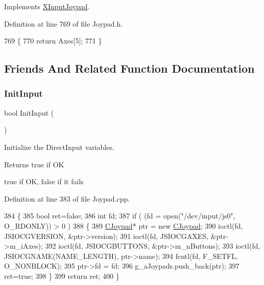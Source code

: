 Implements \hyperlink{struct_x_input_joypad_a4319cae362154a8e069ebe290db8239b}{X\+Input\+Joypad}.



Definition at line 769 of file Joypad.\+h.


\begin{DoxyCode}
769                             \{
770         \textcolor{keywordflow}{return} Axes[5];
771     \}
\end{DoxyCode}


\subsection{Friends And Related Function Documentation}
\mbox{\label{class_c_joypad_ab38988ebf6ab3808447c491d4f5874e0}} 
\subsubsection{\texorpdfstring{Init\+Input}{InitInput}}
{\footnotesize\ttfamily bool Init\+Input (\begin{DoxyParamCaption}{ }\end{DoxyParamCaption})\hspace{0.3cm}{\ttfamily [friend]}}



Initialize the Direct\+Input variables. 

\begin{DoxyReturn}{Returns}
true if OK

true if OK, false if it fails 
\end{DoxyReturn}


Definition at line 383 of file Joypad.\+cpp.


\begin{DoxyCode}
384 \{
385     \textcolor{keywordtype}{bool} ret=\textcolor{keyword}{false};
386     \textcolor{keywordtype}{int} fd;
387     \textcolor{keywordflow}{if} ( (fd = open(\textcolor{stringliteral}{"/dev/input/js0"}, O\_RDONLY)) > 0 ) 
388     \{
389         \hyperlink{class_c_joypad}{CJoypad}* ptr = \textcolor{keyword}{new} \hyperlink{class_c_joypad}{CJoypad};
390         ioctl(fd, JSIOCGVERSION, &ptr->version);
391         ioctl(fd, JSIOCGAXES, &ptr->m\_iAxes);
392         ioctl(fd, JSIOCGBUTTONS, &ptr->m\_nButtons);
393         ioctl(fd, JSIOCGNAME(NAME\_LENGTH), ptr->name);
394         fcntl(fd, F\_SETFL, O\_NONBLOCK);
395         ptr->fd = fd;
396         g\_aJoypads.push\_back(ptr);
397         ret=\textcolor{keyword}{true};
398     \}
399     \textcolor{keywordflow}{return} ret;
400 \}
\end{DoxyCode}
\mbox{\label{class_c_joypad_a4d5dc1be49e0a6ddee2df5035bc2b56f}} 
